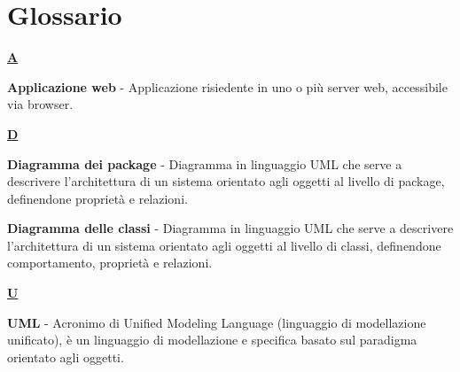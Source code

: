 \documentclass[../ManualeUtente.tex]{subfiles}
\begin{document}
	\section{Glossario}\label{sez:Glossario}
		\begin{description}
			\item \textbf{\underline{A}}
				\item \textbf{Applicazione web} - Applicazione risiedente in uno o più server web, accessibile via
				browser.
			\item \textbf{\underline{D}}
				\item \textbf{Diagramma dei package} - Diagramma in linguaggio UML che serve a descrivere
				l'architettura di un sistema orientato agli oggetti al livello di package, definendone proprietà e
				relazioni.
				\item \textbf{Diagramma delle classi} - Diagramma in linguaggio UML che serve a descrivere
				l'architettura di un sistema orientato agli oggetti al livello di classi, definendone comportamento,
				proprietà e relazioni.
			\item \textbf{\underline{U}}
				\item \textbf{UML} - Acronimo di Unified Modeling Language (linguaggio di modellazione unificato),
				è un linguaggio di modellazione e specifica basato sul paradigma orientato agli oggetti.
		\end{description}
\end{document}
